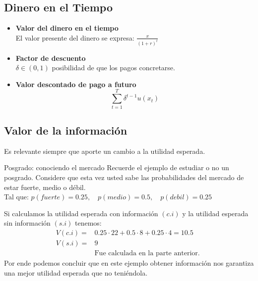 \documentclass[12pt]{article}
\begin{document}
\subsection{Dinero en el Tiempo}
\begin{itemize}
    \item \textbf{Valor del dinero en el tiempo} \\ 
    El valor presente del dinero se expresa: $\frac{x}{(1+r)^t}$
    \item \textbf{Factor de descuento}\\
    $\delta\in(0,1)$ posibilidad de que los pagos concretarse. 
    \item \textbf{Valor descontado de pago a futuro}\\
    $$\sum_{t=1}^T \delta^{t-1}u(x_t)$$ 
\end{itemize}

\newpage
\subsection{Valor de la información}
Es relevante siempre que aporte un cambio a la utilidad esperada. 
\begin{ejemplo}{Posgrado: conociendo el mercado}
    Recuerde el ejemplo de estudiar o no un posgrado. Considere que esta vez usted sabe las probabilidades del mercado de estar fuerte, medio o débil. \\
    Tal que: $p(fuerte)=0.25,\quad p(medio)=0.5, \quad p(debil)=0.25$
    \begin{figure} [H]
        \centering
        
        \label{fig:placeholder}
    \end{figure}
    Si calculamos la utilidad esperada con información $(c.i)$ y la utilidad esperada sin información $(s.i)$ tenemos: 
    \begin{align*}
        V(c.i)=&0.25\cdot22+0.5\cdot 8+0.25\cdot 4= 10.5 \\
        V(s.i)=&9 \\
        &\text{Fue calculada en la parte anterior. }    
    \end{align*}
    Por ende podemos concluir que en este ejemplo obtener información nos garantiza una mejor utilidad esperada que no teniéndola. 
\end{ejemplo}
\end{document}
